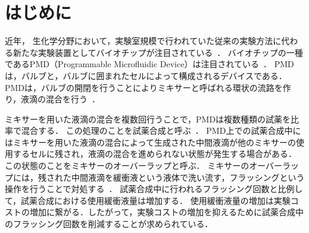 \chapter{はじめに}
 \setlength{\parskip}{0cm} %
 \setlength{\itemsep}{0cm} %

    近年， 生化学分野において，実験室規模で行われていた従来の実験方法に代わる新たな実験装置としてバイオチップが注目されている~\cite{10.1146}\cite{urbanski2006}\cite{gubala2012point}．
    バイオチップの一種であるPMD（Programmable Microfluidic Device）は注目されている~\cite{1}\cite{9045675}\cite{10247720}．
    PMDは，バルブと，バルブに囲まれたセルによって構成されるデバイスである．
    PMDは，バルブの開閉を行うことによりミキサーと呼ばれる環状の流路を作り，液滴の混合を行う~\cite{FU2015343}\cite{7926964}．

    ミキサーを用いた液滴の混合を複数回行うことで，PMDは複数種類の試薬を比率で混合する．
    この処理のことを試薬合成と呼ぶ~\cite{2}\cite{poddar2021generic}．
    PMD上での試薬合成中にはミキサーを用いた液滴の混合によって生成された中間液滴が他のミキサーの使用するセルに残され，液滴の混合を進められない状態が発生する場合がある．
    この状態のことをミキサーのオーバーラップと呼ぶ．
    ミキサーのオーバーラップには，残された中間液滴を緩衝液という液体で洗い流す，フラッシングという操作を行うことで対処する~\cite{8715125}．
    試薬合成中に行われるフラッシング回数と比例して，試薬合成における使用緩衝液量は増加する．
    使用緩衝液量の増加は実験コストの増加に繋がる．したがって，実験コストの増加を抑えるために試薬合成中のフラッシング回数を削減することが求められている．

